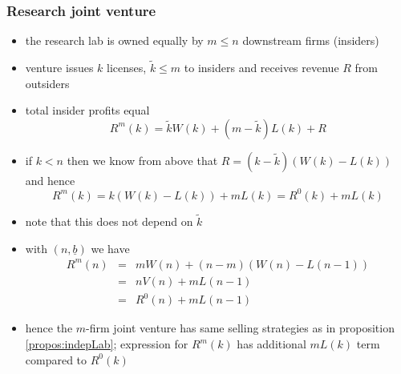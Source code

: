 \documentclass[11pt,english]{beamer}
\begin{document}
\begin{frame}[allowframebreaks]
\begin{itemize}
\end{itemize} %
\end{frame}
\begin{frame}[allowframebreaks]\frametitle{Research joint venture}
\label{sec-2-4}
\begin{itemize}

\item the research lab is owned equally by $m \leq n$ downstream firms (insiders)\\
\label{sec-2-4-1}%
\item venture issues $k$ licenses, $\tilde k \leq m$ to insiders and receives revenue $R$ from outsiders\\
\label{sec-2-4-2}%
\item total insider profits equal
\label{sec-2-4-3}%
\begin{equation*}
R^m(k) = \tilde k W(k) + (m-\tilde k)L(k) +R
\end{equation*}

\item if $k<n$ then we know from above that $R = (k-\tilde k)(W(k)-L(k))$ and hence
\label{sec-2-4-4}%
\begin{equation*}
R^m(k) = k(W(k)-L(k))+mL(k) = R^0(k) +mL(k)
\end{equation*}

\item note that this does not depend on $\tilde k$\\
\label{sec-2-4-5}%
\item with $(n,\underline b)$ we have
\label{sec-2-4-6}%
\begin{eqnarray*}
R^m(n) &=& mW(n)+(n-m)(W(n)-L(n-1)) \\
       &=& nV(n)+mL(n-1) \\
       &=& R^0(n)+mL(n-1)
\end{eqnarray*}

\item hence the $m$-firm joint venture has same selling strategies as in proposition \ref{propos:indepLab}; expression for $R^m(k)$ has additional $mL(k)$ term compared to $R^{0}(k)$\\
\label{sec-2-4-7}%
\end{itemize} %
\end{frame}
\end{document}

